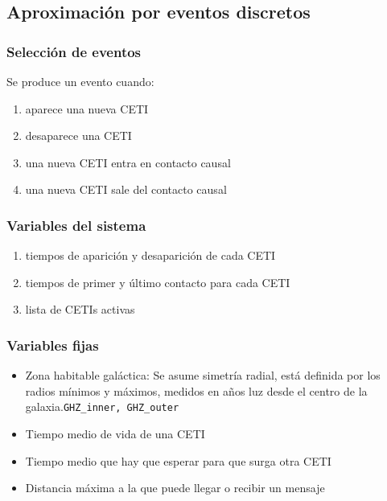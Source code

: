 \documentclass[handout]{beamer}
\theoremstyle{plain}
\theoremstyle{definition}
\theoremstyle{remark}
\begin{document}
\subsection{Aproximación por eventos discretos}

\begin{frame}\frametitle{Selección de eventos}

   Se produce un evento cuando:

   \begin{enumerate}
     \item aparece una nueva CETI
     \item desaparece una CETI
     \item una nueva CETI entra en contacto causal
     \item una nueva CETI sale del contacto causal
   \end{enumerate}

\end{frame}  %

\begin{frame}\frametitle{Variables del sistema}

   \begin{enumerate}
     \item tiempos de aparición y desaparición de cada CETI
     \item tiempos de primer y último contacto para cada CETI
     \item lista de CETIs activas
   \end{enumerate}

\end{frame}  %
 
\begin{frame}\frametitle{Variables fijas}

   \begin{itemize}
      \item Zona habitable galáctica: Se asume simetría radial, está
         definida por los radios mínimos y máximos, medidos en a\~nos
         luz desde el centro de la galaxia.\texttt{GHZ\_inner, GHZ\_outer}
      \item Tiempo medio de vida de una CETI
      \item Tiempo medio que hay que esperar para que surga otra CETI
      \item Distancia máxima a la que puede llegar o recibir un
         mensaje
   \end{itemize}

\end{frame}  %
 
\end{document}
